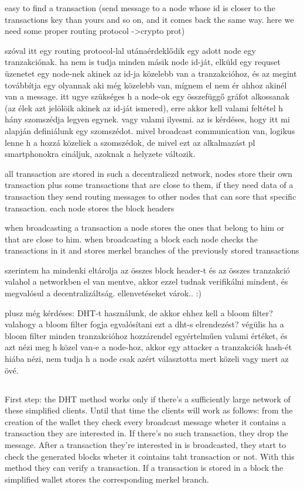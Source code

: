 \documentclass[a4paper,12pt]{article}
\begin{document}
easy to find a transaction (send message to a node whose id is closer to the transactions key than yours and so on, and it comes back the same way. here we need some proper routing protocol ->crypto prot)

szóval itt egy routing protocol-lal utánaérdeklődik egy adott node egy tranzakciónak. ha nem is tudja minden másik node id-ját, elküld egy requset üzenetet egy node-nek akinek az id-ja közelebb van a tranzakcióhoz, és az megint továbbítja egy olyannak aki még közelebb van, mígnem el nem ér ahhoz akinél van a message. itt ugye szükséges h a node-ok egy összefüggő gráfot alkossanak (az élek azt jelölöik akinek az id-ját ismered), erre akkor kell valami feltétel h hány szomszédja legyen egynek. vagy valami ilyesmi. az is kérdéses, hogy itt mi alapján definiálunk egy szomszédot. mivel broadcast communication van, logikus lenne h a hozzá közeliek a szomszédok, de mivel ezt az alkalmazást pl smartphonokra cináljuk, azoknak a helyzete változik.

all transaction are stored in such a decentraliezd network, nodes store their own transaction plus some transactions that are close to them, if they need data of a transaction they send routing messages to other nodes that can sore that specific transaction. each node stores the block headers

when broadcasting a transaction a node stores the ones that belong to him or that are close to him. when broadcasting a block each node checks the transactions in it and stores merkel branches of the previously stored transactions

szerintem ha mindenki eltárolja az összes block header-t és az összes tranzakció valahol a networkben el van mentve, akkor ezzel tudnak verifikálni mindent, és megvalósul a decentralizáltság. ellenvetéseket várok.. :)

plusz még kérdéses: DHT-t használunk, de akkor ehhez kell a bloom filter? valahogy a bloom filter fogja egvalósítani ezt a dht-s elrendezést? végülis ha a bloom filter minden tranzakcióhoz hozzárendel egyértelműen valami értéket, és azt nézi meg h közel van-e a node-hoz, akkor egy attacker a tranzakciók hash-ét hiába nézi, nem tudja h a node csak azért választotta mert közeli vagy mert az övé.

\subsection{}
First step: the DHT method works only if there's a sufficiently large network of these simplified clients. Until that time the clients will work as follows: from the creation of the wallet they check every broadcast message wheter it contains a transaction they are interested in. If there's no such transaction, they drop the message. After a transaction they're interested in is broadcasted, they start to check the generated blocks wheter it cointains taht transaction or not. With this method they can verify a transaction. If a transaction is stored in a block the simplified wallet stores the corresponding merkel branch.
\end{document}
